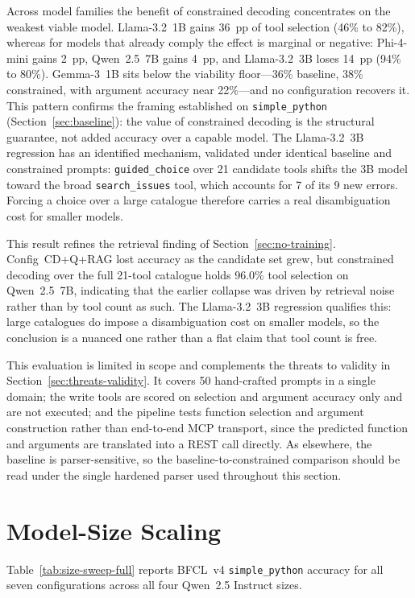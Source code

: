 Across model families the benefit of constrained decoding concentrates on the
weakest viable model. Llama-3.2~1B gains 36~pp of tool selection (46\% to
82\%), whereas for models that already comply the effect is marginal or
negative: Phi-4-mini gains 2~pp, Qwen~2.5~7B gains 4~pp, and Llama-3.2~3B
loses 14~pp (94\% to 80\%). Gemma-3~1B sits below the viability
floor---36\% baseline, 38\% constrained, with argument accuracy near
22\%---and no configuration recovers it. This pattern confirms the framing
established on \texttt{simple\_python} (Section~\ref{sec:baseline}): the value
of constrained decoding is the structural guarantee, not added accuracy over a
capable model. The Llama-3.2~3B regression has an identified mechanism,
validated under identical baseline and constrained prompts:
\texttt{guided\_choice} over 21 candidate tools shifts the 3B model toward the
broad \texttt{search\_issues} tool, which accounts for 7 of its 9 new errors.
Forcing a choice over a large catalogue therefore carries a real disambiguation
cost for smaller models.

This result refines the retrieval finding of Section~\ref{sec:no-training}.
Config~CD+Q+RAG lost accuracy as the candidate set grew, but constrained
decoding over the full 21-tool catalogue holds 96.0\% tool selection on
Qwen~2.5~7B, indicating that the earlier collapse was driven by retrieval noise
rather than by tool count as such. The Llama-3.2~3B regression qualifies this:
large catalogues do impose a disambiguation cost on smaller models, so the
conclusion is a nuanced one rather than a flat claim that tool count is free.

This evaluation is limited in scope and complements the threats to validity in
Section~\ref{sec:threats-validity}. It covers 50 hand-crafted prompts in a
single domain; the write tools are scored on selection and argument accuracy
only and are not executed; and the pipeline tests function selection and
argument construction rather than end-to-end MCP transport, since the predicted
function and arguments are translated into a REST call directly. As elsewhere,
the baseline is parser-sensitive, so the baseline-to-constrained comparison
should be read under the single hardened parser used throughout this section.

\section{Model-Size Scaling}
\label{sec:model-size}

Table~\ref{tab:size-sweep-full} reports BFCL~v4 \texttt{simple\_python}
accuracy for all seven configurations across all four Qwen~2.5 Instruct sizes.

